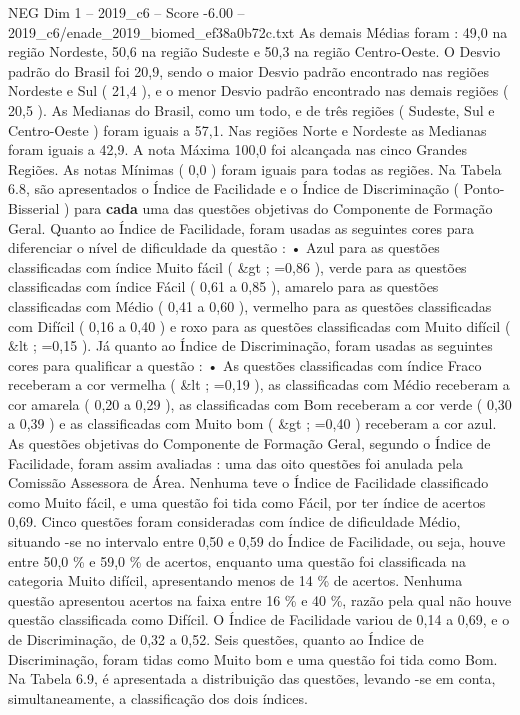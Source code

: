 \begin{textsample}{NEG Dim 1 – 2019\_c6 – Score -6.00 – 2019\_c6/enade\_2019\_biomed\_ef38a0b72c.txt}
As demais Médias foram : 49,0 na região Nordeste, 50,6 na região Sudeste e 50,3 na região Centro-Oeste.
O Desvio padrão do Brasil foi 20,9, sendo o maior Desvio padrão encontrado nas regiões Nordeste e Sul ( 21,4 ), e o menor Desvio padrão encontrado nas demais regiões ( 20,5 ).
As Medianas do Brasil, como um todo, e de três regiões ( Sudeste, Sul e Centro-Oeste ) foram iguais a 57,1.
Nas regiões Norte e Nordeste as Medianas foram iguais a 42,9.
A nota Máxima 100,0 foi alcançada nas cinco Grandes Regiões.
As notas Mínimas ( 0,0 ) foram iguais para todas as regiões.
Na Tabela 6.8, são apresentados o Índice de Facilidade e o Índice de Discriminação ( Ponto-Bisserial ) para \textbf{cada} uma das questões objetivas do Componente de Formação Geral.
Quanto ao Índice de Facilidade, foram usadas as seguintes cores para diferenciar o nível de dificuldade da questão : • Azul para as questões classificadas com índice Muito fácil ( \&gt ; =0,86 ), verde para as questões classificadas com índice Fácil ( 0,61 a 0,85 ), amarelo para as questões classificadas com Médio ( 0,41 a 0,60 ), vermelho para as questões classificadas com Difícil ( 0,16 a 0,40 ) e roxo para as questões classificadas com Muito difícil ( \&lt ; =0,15 ).
Já quanto ao Índice de Discriminação, foram usadas as seguintes cores para qualificar a questão : • As questões classificadas com índice Fraco receberam a cor vermelha ( \&lt ; =0,19 ), as classificadas com Médio receberam a cor amarela ( 0,20 a 0,29 ), as classificadas com Bom receberam a cor verde ( 0,30 a 0,39 ) e as classificadas com Muito bom ( \&gt ; =0,40 ) receberam a cor azul.
As questões objetivas do Componente de Formação Geral, segundo o Índice de Facilidade, foram assim avaliadas : uma das oito questões foi anulada pela Comissão Assessora de Área.
Nenhuma teve o Índice de Facilidade classificado como Muito fácil, e uma questão foi tida como Fácil, por ter índice de acertos 0,69.
Cinco questões foram consideradas com índice de dificuldade Médio, situando -se no intervalo entre 0,50 e 0,59 do Índice de Facilidade, ou seja, houve entre 50,0 \% e 59,0 \% de acertos, enquanto uma questão foi classificada na categoria Muito difícil, apresentando menos de 14 \% de acertos.
Nenhuma questão apresentou acertos na faixa entre 16 \% e 40 \%, razão pela qual não houve questão classificada como Difícil.
O Índice de Facilidade variou de 0,14 a 0,69, e o de Discriminação, de 0,32 a 0,52.
Seis questões, quanto ao Índice de Discriminação, foram tidas como Muito bom e uma questão foi tida como Bom.
Na Tabela 6.9, é apresentada a distribuição das questões, levando -se em conta, simultaneamente, a classificação dos dois índices.

\end{textsample}
